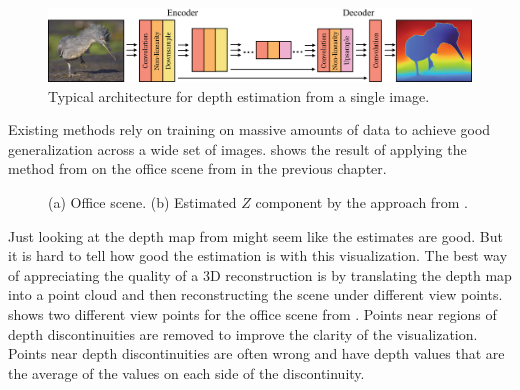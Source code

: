 \begin{figure}[t]
    \centerline{
        \includegraphics[width=1\linewidth]{figures/learning_3d/encoder_decoder_arch.eps}
    }
    \caption{Typical architecture for depth estimation from a single image\cite{Xian2018}. }
    \label{fig:encoder_decoder_arch_depth}
\end{figure}

Existing methods rely on training on massive amounts of data to achieve good generalization across a wide set of images. \Fig{\ref{fig:office_midas}} shows the result of applying the method from \cite{Ranftl2022} on the office scene from \fig{\ref{fig:finding_depth_office}} in the previous chapter.

\begin{figure}
    \centerline{
    }
    \caption{(a) Office scene. (b) Estimated $Z$ component by the approach from \cite{Ranftl2021,Ranftl2022}.}
    \label{fig:office_midas}
\end{figure}


Just looking at the depth map from  might seem like the estimates are good. But it is hard to tell how good the estimation is with this visualization. The best way of appreciating the quality of a 3D reconstruction is by translating the depth map into a point cloud and then reconstructing the scene under different view points. \Fig{\ref{fig:office_midas_point_cloud}} shows two different view points for the office scene from \fig{\ref{fig:office_midas}}. Points near regions of depth discontinuities are removed to improve the clarity of the visualization. Points near depth discontinuities are often wrong and have depth values that are the average of the values on each side of the discontinuity.


